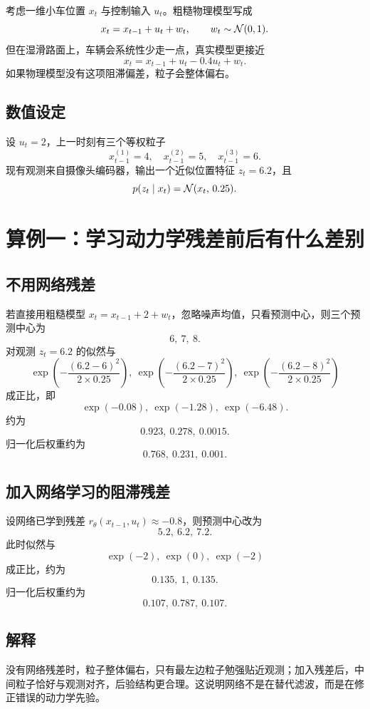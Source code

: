 \documentclass[12pt,a4paper]{ctexart}
\begin{document}
考虑一维小车位置 \(x_t\) 与控制输入 \(u_t\)。粗糙物理模型写成
\[
x_t = x_{t-1} + u_t + w_t,
\qquad
w_t \sim \mathcal{N}(0,1).
\]
但在湿滑路面上，车辆会系统性少走一点，真实模型更接近
\[
x_t = x_{t-1} + u_t - 0.4u_t + w_t.
\]
如果物理模型没有这项阻滞偏差，粒子会整体偏右。

\subsection{数值设定}

设 \(u_t=2\)，上一时刻有三个等权粒子
\[
x_{t-1}^{(1)}=4,\quad x_{t-1}^{(2)}=5,\quad x_{t-1}^{(3)}=6.
\]
现有观测来自摄像头编码器，输出一个近似位置特征 \(z_t=6.2\)，且
\[
p(z_t \mid x_t)=\mathcal{N}(x_t,\,0.25).
\]

\section{算例一：学习动力学残差前后有什么差别}

\subsection{不用网络残差}

若直接用粗糙模型 \(x_t=x_{t-1}+2+w_t\)，忽略噪声均值，只看预测中心，则三个预测中心为
\[
6,\ 7,\ 8.
\]
对观测 \(z_t=6.2\) 的似然与
\[
\exp\!\left(-\frac{(6.2-6)^2}{2\times 0.25}\right),\ 
\exp\!\left(-\frac{(6.2-7)^2}{2\times 0.25}\right),\ 
\exp\!\left(-\frac{(6.2-8)^2}{2\times 0.25}\right)
\]
成正比，即
\[
\exp(-0.08),\ \exp(-1.28),\ \exp(-6.48).
\]
约为
\[
0.923,\ 0.278,\ 0.0015.
\]
归一化后权重约为
\[
0.768,\ 0.231,\ 0.001.
\]

\subsection{加入网络学习的阻滞残差}

设网络已学到残差 \(r_\theta(x_{t-1},u_t)\approx -0.8\)，则预测中心改为
\[
5.2,\ 6.2,\ 7.2.
\]
此时似然与
\[
\exp(-2),\ \exp(0),\ \exp(-2)
\]
成正比，约为
\[
0.135,\ 1,\ 0.135.
\]
归一化后权重约为
\[
0.107,\ 0.787,\ 0.107.
\]

\subsection{解释}

没有网络残差时，粒子整体偏右，只有最左边粒子勉强贴近观测；加入残差后，中间粒子恰好与观测对齐，后验结构更合理。这说明网络不是在替代滤波，而是在修正错误的动力学先验。
\end{document}

